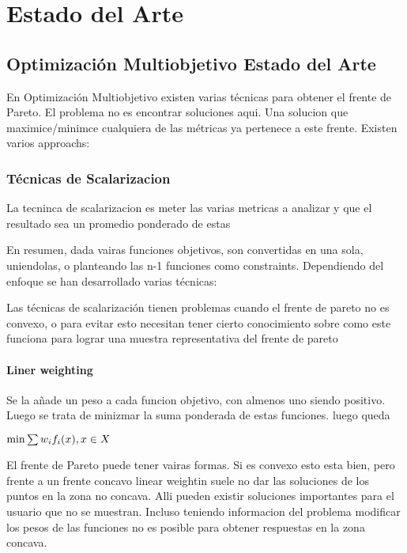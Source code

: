 \chapter{Estado del Arte}\label{chapter:state-of-the-art}

\section*{Optimizaci\'on Multiobjetivo Estado del Arte}

En Optimizaci\'on Multiobjetivo existen varias t\'ecnicas para obtener el frente de Pareto. El problema no es encontrar soluciones aqui. Una solucion que maximice/minimce cualquiera de las m\'etricas ya pertenece a este frente. Existen varios approachs:

\subsection*{T\'ecnicas de Scalarizacion}

La tecninca de scalarizacion es meter las varias metricas a analizar y que el resultado sea un promedio ponderado de estas

En resumen, dada vairas funciones objetivos, son convertidas en una sola, uniendolas, o planteando las n-1 funciones como constraints. Dependiendo del enfoque se han desarrollado varias t\'ecnicas:

Las t\'ecnicas de scalarizaci\'on tienen problemas cuando el frente de pareto no es convexo, o para evitar esto necesitan tener cierto conocimiento sobre como este funciona para lograr una muestra representativa del frente de pareto

\subsubsection*{Liner weighting}
Se la a\~nade un peso a cada funcion objetivo, con almenos uno siendo positivo. Luego se trata de minizmar la suma ponderada de estas funciones. luego queda

\begin{math}
    \min \sum w_i f_i(x), \space x \in X
\end{math}

El frente de Pareto puede tener vairas formas. Si es convexo esto esta bien, pero frente a un frente concavo linear weightin suele no dar las soluciones de los puntos en la zona no concava. Alli pueden existir soluciones importantes para el usuario que no se muestran. Incluso teniendo informacion del problema modificar los pesos de las funciones no es posible para obtener respuestas en la zona concava.

